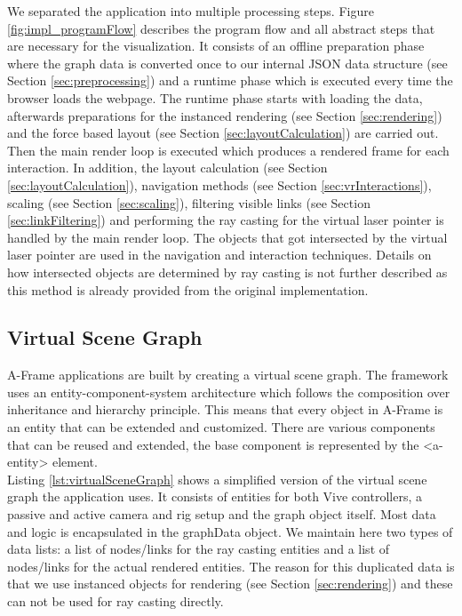 We separated the application into multiple processing steps. Figure \ref{fig:impl_programFlow} describes the program flow and all abstract steps that are necessary for the visualization.
It consists of an offline preparation phase where the graph data is converted once to our internal JSON data structure (see Section \ref{sec:preprocessing}) and a runtime phase which is executed every time the browser loads the webpage.
The runtime phase starts with loading the data, afterwards preparations for the instanced rendering (see Section \ref{sec:rendering}) and the force based layout (see Section \ref{sec:layoutCalculation}) are carried out.
Then the main render loop is executed which produces a rendered frame for each interaction. In addition, the layout calculation (see Section \ref{sec:layoutCalculation}), navigation methods (see Section \ref{sec:vrInteractions}), scaling (see Section \ref{sec:scaling}), filtering visible links (see Section \ref{sec:linkFiltering}) and performing the ray casting for the virtual laser pointer is handled by the main render loop.
The objects that got intersected by the virtual laser pointer are used in the navigation and interaction techniques. 
Details on how intersected objects are determined by ray casting is not further described as this method is already provided from the original implementation. 

\subsection{Virtual Scene Graph}
A-Frame applications are built by creating a virtual scene graph.
The framework uses an entity-component-system architecture which follows the composition over inheritance and hierarchy principle. 
This means that every object in A-Frame is an entity that can be extended and customized.
There are various components that can be reused and extended, the base component is represented by the <a-entity> element.\\
Listing \ref{lst:virtualSceneGraph} shows a simplified version of the virtual scene graph the application uses. 
It consists of entities for both Vive controllers, a passive and active camera and rig setup and the graph object itself.
Most data and logic is encapsulated in the graphData object. We maintain here two types of data lists: a list of nodes/links for the ray casting entities and a list of nodes/links for the actual rendered entities. 
The reason for this duplicated data is that we use  instanced objects for rendering (see Section \ref{sec:rendering}) and these can not be used for ray casting directly.
\pagebreak

